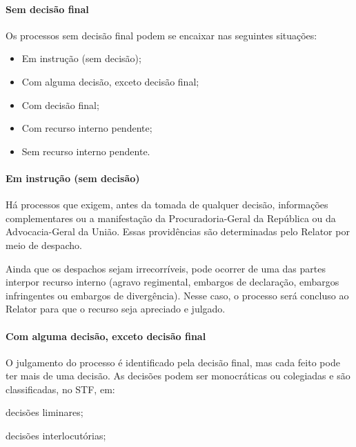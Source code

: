 \documentclass[
]{book}
\providecommand{\tightlist}{%
  \setlength{\itemsep}{0pt}\setlength{\parskip}{0pt}}
\theoremstyle{definition}
\theoremstyle{definition}
\theoremstyle{definition}
\theoremstyle{definition}
\theoremstyle{remark}
\begin{document}
\hypertarget{sem-decisuxe3o-final}{%
\paragraph{Sem decisão final}\label{sem-decisuxe3o-final}}

Os processos sem decisão final podem se encaixar nas seguintes situações:

\begin{itemize}
\tightlist
\item
  Em instrução (sem decisão);
\item
  Com alguma decisão, exceto decisão final;
\item
  Com decisão final;
\item
  Com recurso interno pendente;
\item
  Sem recurso interno pendente.
\end{itemize}

\hypertarget{em-instruuxe7uxe3o-sem-decisuxe3o}{%
\paragraph{Em instrução (sem decisão)}\label{em-instruuxe7uxe3o-sem-decisuxe3o}}

Há processos que exigem, antes da tomada de qualquer decisão, informações complementares ou a manifestação da Procuradoria-Geral da República ou da Advocacia-Geral da União. Essas providências são determinadas pelo Relator por meio de despacho.

Ainda que os despachos sejam irrecorríveis, pode ocorrer de uma das partes interpor recurso interno (agravo regimental, embargos de declaração, embargos infringentes ou embargos de divergência). Nesse caso, o processo será concluso ao Relator para que o recurso seja apreciado e julgado.

\hypertarget{com-alguma-decisuxe3o-exceto-decisuxe3o-final}{%
\paragraph{Com alguma decisão, exceto decisão final}\label{com-alguma-decisuxe3o-exceto-decisuxe3o-final}}

O julgamento do processo é identificado pela decisão final, mas cada feito pode ter mais de uma decisão. As decisões podem ser monocráticas ou colegiadas e são classificadas, no STF, em:

decisões liminares;

decisões interlocutórias;
\end{document}
